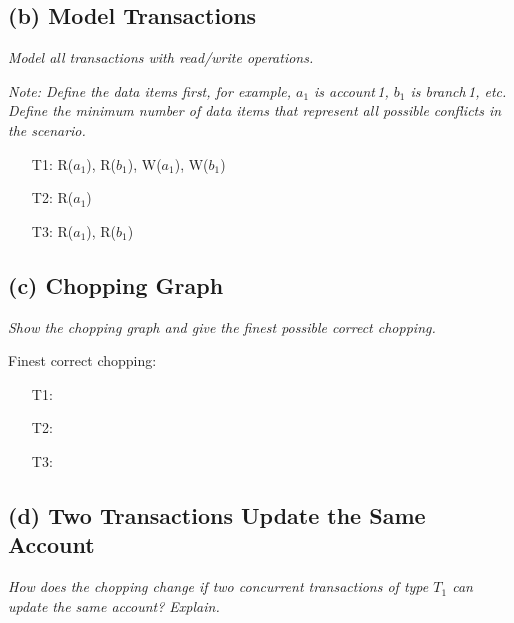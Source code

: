\documentclass[11pt]{scrartcl}
\begin{document}
\subsection*{(b) Model Transactions}

{\it Model all transactions with read/write operations.}

\smallskip

{\it Note: Define the data items first, for example, $a_1$ is
   account\,1, $b_1$ is branch\,1, etc. Define the minimum number of
  data items that represent all possible conflicts in the scenario.}

\begin{enumerate}
\item[T1:] R($a_1$), R($b_1$), W($a_1$), W($b_1$)
\item[T2:] R($a_1$)
\item[T3:] R($a_1$), R($b_1$)
\end{enumerate}

\subsection*{(c) Chopping Graph}

{\it Show the chopping graph and give the finest possible correct
  chopping.}

\medskip

\noindent
{}

\medskip

\noindent Finest correct chopping:
\begin{enumerate}
\item[T1:]
\item[T2:]
\item[T3:] 
\end{enumerate}

\subsection*{(d) Two Transactions Update the Same Account}

{\it How does the chopping change if two concurrent transactions of type
$T_1$ can update the same account? Explain.}
\end{document}
